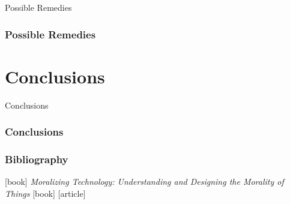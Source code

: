 \documentclass{beamer}
\begin{document}
\begin{frame}
\begin{center} 
	 Possible Remedies
\end{center}
\end{frame}

\begin{frame}
\frametitle{Possible Remedies}

\end{frame}

\section{Conclusions}

\begin{frame}
\begin{center} 
	 Conclusions
\end{center}
\end{frame}

\begin{frame}
\frametitle{Conclusions}
\end{frame}

\begin{frame}
\frametitle{Bibliography}
\begin{thebibliography}{9}
	[book]
	\textit{Moralizing Technology: Understanding and Designing the Morality of Things}
	[book]
	[article]

\end{thebibliography}
\end{frame}
\end{document}
